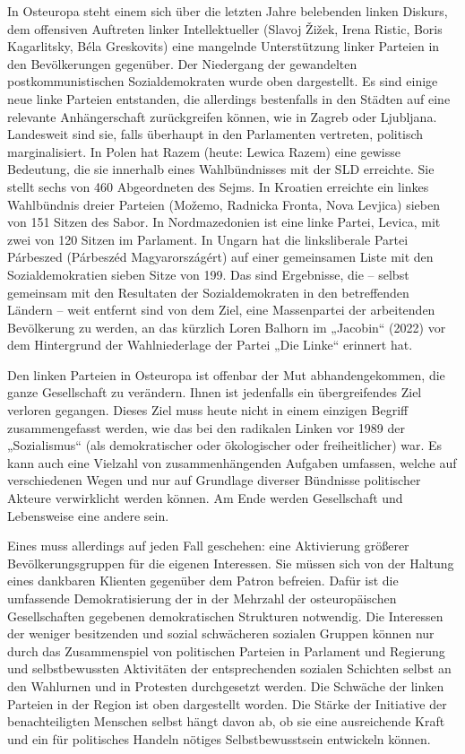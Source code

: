 \begin{multicols*}{2}
In Osteuropa steht einem sich über die letzten Jahre belebenden linken Diskurs, dem offensiven Auftreten linker Intellektueller (Slavoj Žižek, Irena Ristic, Boris Kagarlitsky, Béla Greskovits) eine mangelnde Unterstützung linker Parteien in den Bevölkerungen gegenüber. Der Niedergang der gewandelten postkommunistischen Sozialdemokraten wurde oben dargestellt. Es sind einige neue linke Parteien entstanden, die allerdings bestenfalls in den Städten auf eine relevante Anhängerschaft zurückgreifen können, wie in Zagreb oder Ljubljana. Landesweit sind sie, falls überhaupt in den Parlamenten vertreten, politisch marginalisiert. In Polen hat Razem (heute: Lewica Razem) eine gewisse Bedeutung, die sie innerhalb eines Wahlbündnisses mit der SLD erreichte. Sie stellt sechs von 460 Abgeordneten des Sejms. In Kroatien erreichte ein linkes Wahlbündnis dreier Parteien (Možemo, Radnicka Fronta, Nova Levjica) sieben von 151 Sitzen des Sabor. In Nordmazedonien ist eine linke Partei, Levica, mit zwei von 120 Sitzen im Parlament. In Ungarn hat die linksliberale Partei Párbeszed (Párbeszéd Magyarországért) auf einer gemeinsamen Liste mit den Sozialdemokratien sieben Sitze von 199. Das sind Ergebnisse, die – selbst gemeinsam mit den Resultaten der Sozialdemokraten in den betreffenden Ländern – weit entfernt sind von dem Ziel, eine Massenpartei der arbeitenden Bevölkerung zu werden, an das kürzlich Loren Balhorn im „Jacobin“ (2022) vor dem Hintergrund der Wahlniederlage der Partei „Die Linke“ erinnert hat.

Den linken Parteien in Osteuropa ist offenbar der Mut abhandengekommen, die ganze Gesellschaft zu verändern. Ihnen ist jedenfalls ein übergreifendes Ziel verloren gegangen. Dieses Ziel muss heute nicht in einem einzigen Begriff zusammengefasst werden, wie das bei den radikalen Linken vor 1989 der „Sozialismus“ (als demokratischer oder ökologischer oder freiheitlicher) war. Es kann auch eine Vielzahl von zusammenhängenden Aufgaben umfassen, welche auf verschiedenen Wegen und nur auf Grundlage diverser Bündnisse politischer Akteure verwirklicht werden können. Am Ende werden Gesellschaft und Lebensweise eine andere sein. 

Eines muss allerdings auf jeden Fall geschehen: eine Aktivierung größerer Bevölkerungsgruppen für die eigenen Interessen. Sie müssen sich von der Haltung eines dankbaren Klienten gegenüber dem Patron befreien. Dafür ist die umfassende Demokratisierung der in der Mehrzahl der osteuropäischen Gesellschaften gegebenen demokratischen Strukturen notwendig. Die Interessen der weniger besitzenden und sozial schwächeren sozialen Gruppen können nur durch das Zusammenspiel von politischen Parteien in Parlament und Regierung und selbstbewussten Aktivitäten der entsprechenden sozialen Schichten selbst an den Wahlurnen und in Protesten durchgesetzt werden. Die Schwäche der linken Parteien in der Region ist oben dargestellt worden. Die Stärke der Initiative der benachteiligten Menschen selbst hängt davon ab, ob sie eine ausreichende Kraft und ein für politisches Handeln nötiges Selbstbewusstsein entwickeln können. 


\end{multicols*}
